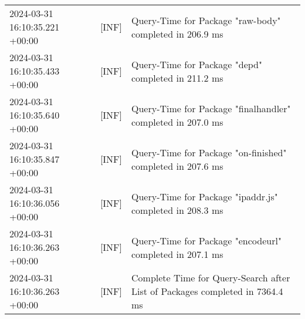 {{\begin{tabularx}{\textwidth}{|l|l|X|}
                    2024-03-31 16:10:35.221 +00:00 & [INF] & Query-Time for Package "raw-body" completed in 206.9 ms \\
                    2024-03-31 16:10:35.433 +00:00 & [INF] & Query-Time for Package "depd" completed in 211.2 ms \\
                    2024-03-31 16:10:35.640 +00:00 & [INF] & Query-Time for Package "finalhandler" completed in 207.0 ms \\
                    2024-03-31 16:10:35.847 +00:00 & [INF] & Query-Time for Package "on-finished" completed in 207.6 ms \\
                    2024-03-31 16:10:36.056 +00:00 & [INF] & Query-Time for Package "ipaddr.js" completed in 208.3 ms \\
                    2024-03-31 16:10:36.263 +00:00 & [INF] & Query-Time for Package "encodeurl" completed in 207.1 ms \\
                    2024-03-31 16:10:36.263 +00:00 & [INF] & Complete Time for Query-Search after List of Packages completed in 7364.4 ms \\
                    \hline
                \end{tabularx}
            }
        }

